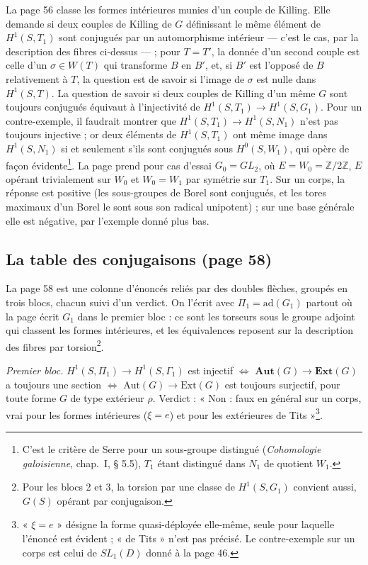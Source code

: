 \documentclass[11pt,a4paper]{article}
\begin{document}
La page 56 classe les formes intérieures munies d'un couple de Killing. Elle
demande si deux couples de Killing de $G$ définissant le même élément de
$H^1(S,T_1)$ sont conjugués par un automorphisme intérieur — c'est le cas, par la
description des fibres ci-dessus — ; pour $T = T'$, la donnée d'un second couple
est celle d'un $\sigma \in W(T)$ qui transforme $B$ en $B'$, et, si $B'$ est
l'opposé de $B$ relativement à $T$, la question est de savoir si l'image de
$\sigma$ est nulle dans $H^1(S,T)$. La question de savoir si deux couples de
Killing d'un même $G$ sont toujours conjugués équivaut à l'injectivité de
$H^1(S,T_1) \to H^1(S,G_1)$. Pour un contre-exemple, il faudrait montrer que
$H^1(S,T_1) \to H^1(S,N_1)$ n'est pas toujours injective ; or deux éléments de
$H^1(S,T_1)$ ont même image dans $H^1(S,N_1)$ si et seulement s'ils sont
conjugués sous $H^0(S,W_1)$, qui opère de façon évidente\footnote{C'est le
critère de Serre pour un sous-groupe distingué (\emph{Cohomologie galoisienne},
chap.~I, § 5.5), $T_1$ étant distingué dans $N_1$ de quotient $W_1$.}. La page
prend pour cas d'essai $G_0 = GL_2$, où $E = W_0 = \mathbb{Z}/2\mathbb{Z}$, $E$
opérant trivialement sur $W_0$ et $W_0 = W_1$ par symétrie sur $T_1$. Sur un corps,
la réponse est positive (les sous-groupes de Borel sont conjugués, et les tores
maximaux d'un Borel le sont sous son radical unipotent) ; sur une base générale
elle est négative, par l'exemple donné plus bas.

\subsection*{La table des conjugaisons (page 58)}

La page 58 est une colonne d'énoncés reliés par des doubles flèches, groupés
en trois blocs, chacun suivi d'un verdict. On l'écrit avec $\Pi_1 = \mathrm{ad}(G_1)$
partout où la page écrit $G_1$ dans le premier bloc : ce sont les torseurs sous
le groupe adjoint qui classent les formes intérieures, et les équivalences
reposent sur la description des fibres par torsion\footnote{Pour les blocs 2 et
3, la torsion par une classe de $H^1(S,G_1)$ convient aussi, $G(S)$ opérant par
conjugaison.}.

\emph{Premier bloc.} $H^1(S,\Pi_1) \to H^1(S,\Gamma_1)$ est injectif $\Leftrightarrow$
$\mathbf{Aut}(G) \to \mathbf{Ext}(G)$ a toujours une section $\Leftrightarrow$
$\mathrm{Aut}(G) \to \mathrm{Ext}(G)$ est toujours surjectif, pour toute forme $G$
de type extérieur $\rho$. Verdict : « Non : faux en général sur un corps, vrai pour les formes
intérieures ($\xi = e$) et pour les extérieures de Tits »\footnote{« $\xi = e$ »
désigne la forme quasi-déployée elle-même, seule pour laquelle l'énoncé est
évident ; « de Tits » n'est pas précisé. Le contre-exemple sur un corps est celui
de $SL_1(D)$ donné à la page 46.}.
\end{document}
